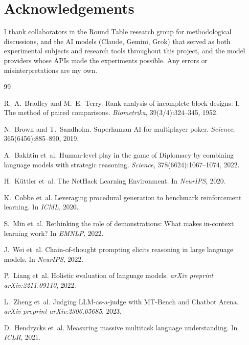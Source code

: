 \documentclass[11pt]{article}
\begin{document}
\section*{Acknowledgements}
I thank collaborators in the Round Table research group for methodological discussions, and the AI models (Claude, Gemini, Grok) that served as both experimental subjects and research tools throughout this project, and the model providers whose APIs made the experiments possible.
Any errors or misinterpretations are my own.

\begin{thebibliography}{99}

R.~A.~Bradley and M.~E.~Terry.
\newblock Rank analysis of incomplete block designs: {I}. {T}he method of paired comparisons.
\newblock \emph{Biometrika}, 39(3/4):324--345, 1952.

N.~Brown and T.~Sandholm.
\newblock Superhuman {AI} for multiplayer poker.
\newblock \emph{Science}, 365(6456):885--890, 2019.

A.~Bakhtin et~al.
\newblock Human-level play in the game of {D}iplomacy by combining language models with strategic reasoning.
\newblock \emph{Science}, 378(6624):1067--1074, 2022.

H.~K{\"u}ttler et~al.
\newblock The {N}et{H}ack {L}earning {E}nvironment.
\newblock In \emph{NeurIPS}, 2020.

K.~Cobbe et~al.
\newblock Leveraging procedural generation to benchmark reinforcement learning.
\newblock In \emph{ICML}, 2020.

S.~Min et~al.
\newblock Rethinking the role of demonstrations: What makes in-context learning work?
\newblock In \emph{EMNLP}, 2022.

J.~Wei et~al.
\newblock Chain-of-thought prompting elicits reasoning in large language models.
\newblock In \emph{NeurIPS}, 2022.

P.~Liang et~al.
\newblock Holistic evaluation of language models.
\newblock \emph{arXiv preprint arXiv:2211.09110}, 2022.

L.~Zheng et~al.
\newblock Judging {LLM}-as-a-judge with {MT}-{B}ench and {C}hatbot {A}rena.
\newblock \emph{arXiv preprint arXiv:2306.05685}, 2023.

D.~Hendrycks et~al.
\newblock Measuring massive multitask language understanding.
\newblock In \emph{ICLR}, 2021.


\end{thebibliography}
\end{document}
